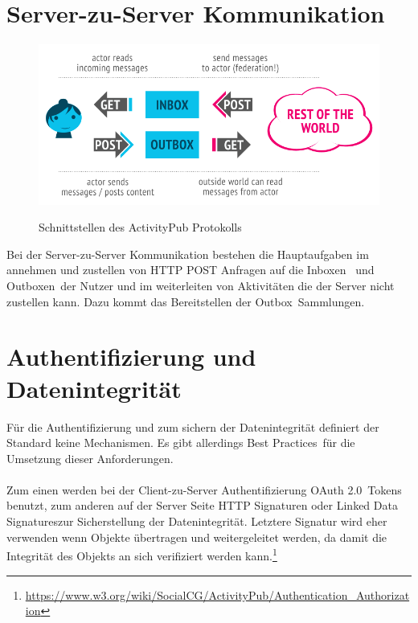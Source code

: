 \section{Server-zu-Server Kommunikation}
	\begin{figure}[h]
		\centering
		\includegraphics[scale=0.55]{figures/client-server-federated.png}
		\label{Client zu Server und Server zu Server Interaktionen}
		\caption{Schnittstellen des ActivityPub Protokolls}
	\end{figure}
Bei der Server-zu-Server Kommunikation bestehen die Hauptaufgaben im annehmen und zustellen von HTTP POST Anfragen auf die \glqq Inboxen\grqq~ und \glqq Outboxen\grqq~der Nutzer und im weiterleiten von Aktivitäten die der Server nicht zustellen kann. Dazu kommt das Bereitstellen der \glqq Outbox\grqq~Sammlungen.
\section{Authentifizierung und Datenintegrität}
	Für die Authentifizierung und zum sichern der Datenintegrität definiert der Standard keine Mechanismen. Es gibt allerdings \glqq Best Practices\grqq~für die Umsetzung dieser Anforderungen.
	\\\\Zum einen werden bei der Client-zu-Server Authentifizierung \glqq OAuth 2.0\grqq~Tokens benutzt, zum anderen auf der Server Seite HTTP Signaturen oder \glqq Linked Data Signatures\grqq zur Sicherstellung der Datenintegrität. Letztere Signatur wird eher verwenden wenn Objekte übertragen und weitergeleitet werden, da damit die Integrität des Objekts an sich verifiziert werden kann.\footnote{\url{https://www.w3.org/wiki/SocialCG/ActivityPub/Authentication_Authorization}}